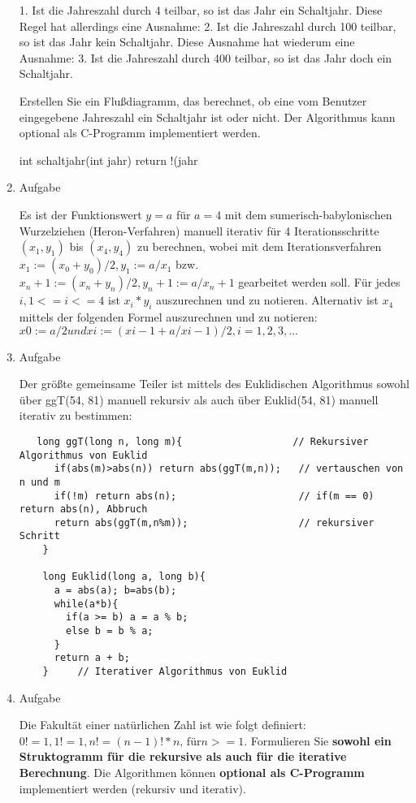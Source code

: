 \documentclass[12pt,a4paper]{scrreprt}
\begin{document}
\begin{enumerate}
1. Ist die Jahreszahl durch 4 teilbar, so ist das Jahr ein Schaltjahr. Diese Regel hat allerdings eine Ausnahme:
2. Ist die Jahreszahl durch 100 teilbar, so ist das Jahr kein Schaltjahr. Diese Ausnahme hat wiederum eine Ausnahme:
3. Ist die Jahreszahl durch 400 teilbar, so ist das Jahr doch ein Schaltjahr.

Erstellen Sie ein Flußdiagramm, das berechnet, ob eine vom Benutzer eingegebene Jahreszahl ein Schaltjahr ist oder nicht. Der Algorithmus kann optional als C-Programm implementiert werden.

    int schaltjahr(int jahr){
      return !(jahr%
    }

\item Aufgabe %

Es ist der Funktionswert $ y = a $ für $ a = 4 $ mit dem sumerisch-babylonischen Wurzelziehen (Heron-Verfahren) manuell iterativ für 4 Iterationsschritte $ (x_1, y_1) $ bis $ (x_4, y_4) $ zu berechnen, wobei mit dem Iterationsverfahren $ x_1 := (x_0 + y_0) / 2 , y_1 := a / x_1 $ bzw. $ x_n+1 := (x_n + y_n) / 2 , y_n+1 := a / x_n+1 $ gearbeitet werden soll. Für jedes $ i, 1 <= i <= 4 $ ist $ x_i * y_i $ auszurechnen und zu notieren.
Alternativ ist $ x_4 $ mittels der folgenden Formel auszurechnen und zu notieren:
$ x0 := a / 2 und xi := ( xi-1 + a / xi-1 ) / 2 , i = 1, 2, 3, ... $

\item Aufgabe %

Der größte gemeinsame Teiler ist mittels des Euklidischen Algorithmus sowohl über ggT(54, 81) manuell rekursiv als auch über Euklid(54, 81) manuell iterativ zu bestimmen:

\begin{lstlisting}
   long ggT(long n, long m){                   // Rekursiver Algorithmus von Euklid
      if(abs(m)>abs(n)) return abs(ggT(m,n));   // vertauschen von n und m
      if(!m) return abs(n);                     // if(m == 0) return abs(n), Abbruch
      return abs(ggT(m,n%m));                   // rekursiver Schritt
    }

    long Euklid(long a, long b){
      a = abs(a); b=abs(b);
      while(a*b){
        if(a >= b) a = a % b;
        else b = b % a;
      }
      return a + b;
    }     // Iterativer Algorithmus von Euklid
\end{lstlisting}

\item Aufgabe %

Die Fakultät einer natürlichen Zahl ist wie folgt definiert: $ 0! = 1 , 1! = 1, n! = (n-1)! * n \text{, für} n >= 1$. Formulieren Sie \textbf{sowohl ein Struktogramm für die rekursive als auch für die iterative Berechnung}. Die Algorithmen können \textbf{optional als C-Programm} implementiert werden (rekursiv und iterativ).


\end{enumerate}
\end{document}
